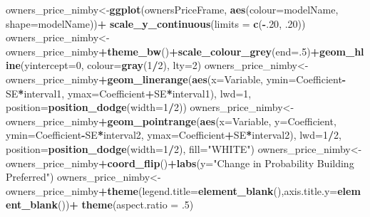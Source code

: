 \documentclass[]{article}
\newenvironment{Shaded}{\begin{snugshade}}{\end{snugshade}}
\newcommand{\DataTypeTok}[1]{\textcolor[rgb]{0.13,0.29,0.53}{#1}}
\newcommand{\DecValTok}[1]{\textcolor[rgb]{0.00,0.00,0.81}{#1}}
\newcommand{\FloatTok}[1]{\textcolor[rgb]{0.00,0.00,0.81}{#1}}
\newcommand{\KeywordTok}[1]{\textcolor[rgb]{0.13,0.29,0.53}{\textbf{#1}}}
\newcommand{\NormalTok}[1]{#1}
\newcommand{\OperatorTok}[1]{\textcolor[rgb]{0.81,0.36,0.00}{\textbf{#1}}}
\newcommand{\StringTok}[1]{\textcolor[rgb]{0.31,0.60,0.02}{#1}}
\begin{document}
\begin{Shaded}
\begin{Highlighting}[]
{\NormalTok{owners_price_nimby<-}\KeywordTok{ggplot}\NormalTok{(ownersPriceFrame, }\KeywordTok{aes}\NormalTok{(}\DataTypeTok{colour=}\NormalTok{modelName, }\DataTypeTok{shape=}\NormalTok{modelName))}\OperatorTok{+}\StringTok{ }\KeywordTok{scale_y_continuous}\NormalTok{(}\DataTypeTok{limits =} \KeywordTok{c}\NormalTok{(}\OperatorTok{-}\NormalTok{.}\DecValTok{20}\NormalTok{, }\FloatTok{.20}\NormalTok{))}
\NormalTok{owners_price_nimby<-owners_price_nimby}\OperatorTok{+}\KeywordTok{theme_bw}\NormalTok{()}\OperatorTok{+}\KeywordTok{scale_colour_grey}\NormalTok{(}\DataTypeTok{end=}\NormalTok{.}\DecValTok{5}\NormalTok{)}\OperatorTok{+}\KeywordTok{geom_hline}\NormalTok{(}\DataTypeTok{yintercept=}\DecValTok{0}\NormalTok{, }\DataTypeTok{colour=}\KeywordTok{gray}\NormalTok{(}\DecValTok{1}\OperatorTok{/}\DecValTok{2}\NormalTok{), }\DataTypeTok{lty=}\DecValTok{2}\NormalTok{)}
\NormalTok{owners_price_nimby<-owners_price_nimby}\OperatorTok{+}\KeywordTok{geom_linerange}\NormalTok{(}\KeywordTok{aes}\NormalTok{(}\DataTypeTok{x=}\NormalTok{Variable, }\DataTypeTok{ymin=}\NormalTok{Coefficient}\OperatorTok{-}\NormalTok{SE}\OperatorTok{*}\NormalTok{interval1, }
                                                          \DataTypeTok{ymax=}\NormalTok{Coefficient}\OperatorTok{+}\NormalTok{SE}\OperatorTok{*}\NormalTok{interval1), }\DataTypeTok{lwd=}\DecValTok{1}\NormalTok{, }\DataTypeTok{position=}\KeywordTok{position_dodge}\NormalTok{(}\DataTypeTok{width=}\DecValTok{1}\OperatorTok{/}\DecValTok{2}\NormalTok{))}
\NormalTok{owners_price_nimby<-owners_price_nimby}\OperatorTok{+}\KeywordTok{geom_pointrange}\NormalTok{(}\KeywordTok{aes}\NormalTok{(}\DataTypeTok{x=}\NormalTok{Variable, }\DataTypeTok{y=}\NormalTok{Coefficient, }\DataTypeTok{ymin=}\NormalTok{Coefficient}\OperatorTok{-}\NormalTok{SE}\OperatorTok{*}\NormalTok{interval2,}
                                                           \DataTypeTok{ymax=}\NormalTok{Coefficient}\OperatorTok{+}\NormalTok{SE}\OperatorTok{*}\NormalTok{interval2), }\DataTypeTok{lwd=}\DecValTok{1}\OperatorTok{/}\DecValTok{2}\NormalTok{,}
                                                       \DataTypeTok{position=}\KeywordTok{position_dodge}\NormalTok{(}\DataTypeTok{width=}\DecValTok{1}\OperatorTok{/}\DecValTok{2}\NormalTok{), }\DataTypeTok{fill=}\StringTok{"WHITE"}\NormalTok{)}
\NormalTok{owners_price_nimby<-owners_price_nimby}\OperatorTok{+}\KeywordTok{coord_flip}\NormalTok{()}\OperatorTok{+}\KeywordTok{labs}\NormalTok{(}\DataTypeTok{y=}\StringTok{"Change in Probability Building Preferred"}\NormalTok{)}
\NormalTok{owners_price_nimby<-owners_price_nimby}\OperatorTok{+}\KeywordTok{theme}\NormalTok{(}\DataTypeTok{legend.title=}\KeywordTok{element_blank}\NormalTok{(),}\DataTypeTok{axis.title.y=}\KeywordTok{element_blank}\NormalTok{())}\OperatorTok{+}\StringTok{ }\KeywordTok{theme}\NormalTok{(}\DataTypeTok{aspect.ratio =} \FloatTok{.5}\NormalTok{)}
}
\end{Highlighting}
\end{Shaded}
\end{document}
